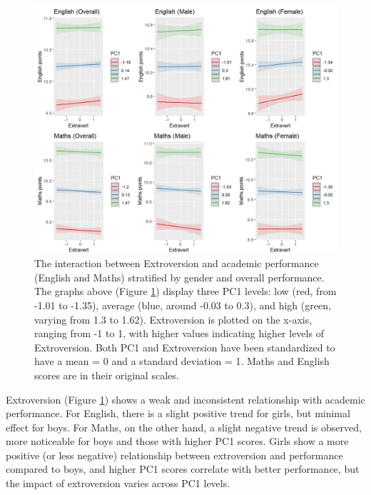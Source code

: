 \documentclass[12pt,a4paper,onecolumn]{article}
\numberwithin{equation}{section}
\begin{document}
\begin{figure}[ht] 
    \centering
    \includegraphics[width=1\linewidth]{AVE_TIPI_Extra.JPG}
    \caption{The interaction between Extroversion and academic performance (English and Maths) stratified by gender and overall performance. The graphs above (Figure \ref{Fig8}) display three PC1 levels: low (red, from -1.01 to -1.35), average (blue, around -0.03 to 0.3), and high (green, varying from 1.3 to 1.62). Extroversion is plotted on the x-axis, ranging from -1 to 1, with higher values indicating higher levels of Extroversion. Both PC1 and Extroversion have been standardized to have a mean = 0 and a standard deviation = 1. Maths and English scores are in their original scales.}
    \label{Fig8}
\end{figure}

Extroversion (Figure \ref{Fig8}) shows a weak and inconsistent relationship with academic performance. For English, there is a slight positive trend for girls, but minimal effect for boys. For Maths, on the other hand, a slight negative trend is observed, more noticeable for boys and those with higher PC1 scores. Girls show a more positive (or less negative) relationship between extroversion and performance compared to boys, and higher PC1 scores correlate with better performance, but the impact of extroversion varies across PC1 levels.
\end{document}
